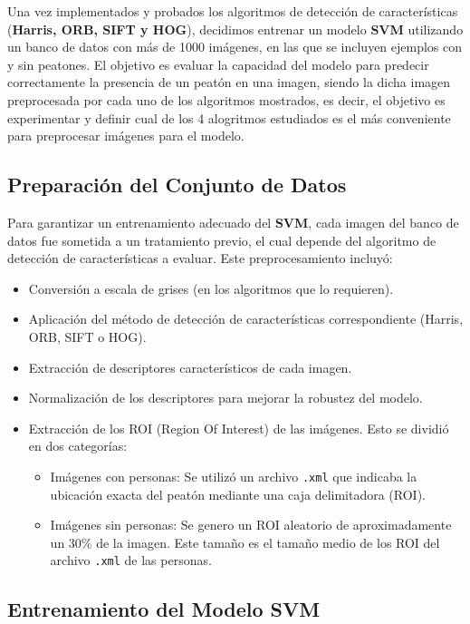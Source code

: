 \documentclass[a4paper]{article}
\begin{document}
Una vez implementados y probados los algoritmos de detección de características (\textbf{Harris, ORB, SIFT y HOG}), decidimos entrenar un modelo \textbf{SVM} utilizando un banco de datos con más de 1000 imágenes, en las que se incluyen ejemplos con y sin peatones. El objetivo es evaluar la capacidad del modelo para predecir correctamente la presencia de un peatón en una imagen, siendo la dicha imagen preprocesada por cada uno de los algoritmos mostrados, es decir, el objetivo es experimentar y definir cual de los 4 alogritmos estudiados es el más conveniente para preprocesar imágenes para el modelo.

\subsection{Preparación del Conjunto de Datos}

Para garantizar un entrenamiento adecuado del \textbf{SVM}, cada imagen del banco de datos fue sometida a un tratamiento previo, el cual depende del algoritmo de detección de características a evaluar. Este preprocesamiento incluyó:
\begin{itemize}
    \item Conversión a escala de grises (en los algoritmos que lo requieren).
    \item Aplicación del método de detección de características correspondiente (Harris, ORB, SIFT o HOG).
    \item Extracción de descriptores característicos de cada imagen.
    \item Normalización de los descriptores para mejorar la robustez del modelo.
    \item Extracción de los ROI (Region Of Interest) de las imágenes. Esto se dividió en dos categorías:
        \begin{itemize}
            \item Imágenes con personas: Se utilizó un archivo \texttt{.xml} que indicaba la ubicación exacta del peatón mediante una caja delimitadora (ROI).
            \item Imágenes sin personas: Se genero un ROI aleatorio de aproximadamente un 30\% de la imagen. Este tamaño es el tamaño medio de los ROI del archivo \texttt{.xml} de las personas.
        \end{itemize}
\end{itemize}

\subsection{Entrenamiento del Modelo SVM}
\end{document}
